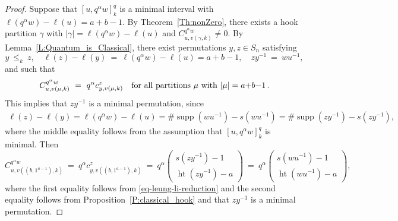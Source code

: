 \documentclass[12pt,oneside,reqno]{amsart}
\theoremstyle{definition}
\numberwithin{equation}{section}
\DeclareMathOperator{\het}{ht}
\DeclareMathOperator{\supp}{supp}
\begin{document}
\begin{proof}
    Suppose that $[u, q^{\alpha}w]_k^q$ is a minimal interval
    with $\ell(q^\alpha w) - \ell(u) = a{+}b{-}1$.
    By Theorem~\ref{Th:nonZero},
    there exists a hook partition $\gamma$
    with $|\gamma| = \ell(q^\alpha w) - \ell(u)$
    and $C^{q^\alpha w}_{u,v(\gamma,k)} \neq 0$.
    By Lemma~\ref{L:Quantum_is_Classical},
    there exist permutations $y, z \in S_n$ satisfying
    \begin{equation}
        \label{properties-of-y-and-z}
        y\ \leq_k\ z,
        \quad
        \ell(z) - \ell(y)\ =\ \ell(q^\alpha w) - \ell(u) = a{+}b{-}1,
        \quad
        zy^{-1}\ =\ wu^{-1},
    \end{equation}
    and such that
    \begin{equation}
        \label{eq-leung-li-reduction}
        C^{q^\alpha w}_{u,v(\mu,k)}\ =\  q^\alpha c^z_{y,v(\mu,k)}
        \quad \text{for all partitions $\mu$ with $|\mu| = a{+}b{-}1$\,.}
    \end{equation}
    This implies that $z y^{-1}$ is a minimal permutation, since
    \begin{align*}
        \ell(z) - \ell(y)
        = \ell(q^\alpha w) - \ell(u)
        = \#\supp(w u^{-1}) - s(w u^{-1})
        = \#\supp(z y^{-1}) - s(z y^{-1}),
    \end{align*}
    where the middle equality follows from the assumption that
    $[u, q^{\alpha}w]_k^q$ is minimal.
    Then
    \begin{equation}
        C^{q^\alpha w}_{u,v((b, 1^{a-1}),k)}
        \ =\ q^\alpha c^z_{y,v((b, 1^{a-1}),k)}
        \ =\ q^\alpha \left(\begin{smallmatrix} s(zy^{-1})-1 \\ \het(zy^{-1})-a \end{smallmatrix}\right)
        \ =\ q^\alpha \left(\begin{smallmatrix} s(wu^{-1})-1 \\ \het(wu^{-1})-a \end{smallmatrix}\right),
    \end{equation}
    where the first equality follows from \eqref{eq-leung-li-reduction}
    and the second equality follows from Proposition~\ref{P:classical_hook}
    and that $z y^{-1}$ is a minimal permutation.


\end{proof}
\end{document}
